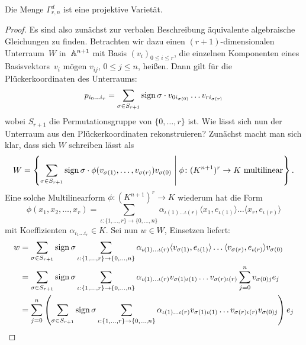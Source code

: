 \begin{fact} \label{fact:gammaproj}
Die Menge $\Gamma_{r,n}^d$ ist eine projektive Varietät.
\end{fact}
\begin{proof}
Es sind also zunächst zur verbalen Beschreibung äquivalente algebraische Gleichungen zu finden. Betrachten wir dazu einen $(r+1)$-dimensionalen Unterraum~$W$ in~$\mathbb A^{n+1}$ mit Basis $(v_i)_{0 \leq i \leq r}$, die einzelnen Komponenten eines Basisvektors~$v_i$ mögen $v_{ij}$, $0 \leq j \leq n$, heißen. Dann gilt für die Plückerkoordinaten des Unterraums:
\begin{equation}
p_{i_0 \dots i_r} = \sum_{\sigma \in S_{r+1}} \operatorname{sign} \sigma \cdot v_{0i_{\sigma(0)}} \dots v_{ri_{\sigma(r)}}
\end{equation}
wobei $S_{r+1}$ die Permutationsgruppe von $\{0,\dots,r\}$ ist. Wie lässt sich nun der Unterraum aus den Plückerkoordinaten rekonstruieren? Zunächst macht man sich klar, dass sich $W$ schreiben lässt als
\begin{equation}
W = \left\{ \sum\limits_{\sigma \in S_{r+1}} \operatorname{sign} \sigma \cdot \phi(v_{\sigma(1)}, \dots, v_{\sigma(r)}) v_{\sigma(0)} \;\middle|\; \phi \colon (K^{n+1})^r \rightarrow K \text{ multilinear} \right\}.
\end{equation}
Eine solche Multilinearform $\phi \colon (K^{n+1})^r \to K$ wiederum hat die Form
\begin{equation}
\phi(x_1, x_2, \dots, x_r) = \sum_{\iota: \{1, \dots, r\} \to \{0, \dots, n\}} \alpha_{\iota(1) \dots \iota(r)} \langle x_1, e_{\iota(1)} \rangle \dots \langle x_r, e_{\iota(r)} \rangle
\end{equation}
mit Koeffizienten $\alpha_{i_1 \dots i_r} \in K$. Sei nun $w \in W$, Einsetzen liefert:
\begin{align*}
w &= \sum\limits_{\sigma \in S_{r+1}} \sign \sigma \sum_{\iota: \{1, \dots, r\} \to \{0, \dots, n\}} \alpha_{\iota(1) \dots \iota(r)} \langle v_{\sigma(1)}, e_{\iota(1)} \rangle \dots \langle v_{\sigma(r)}, e_{\iota(r)} \rangle v_{\sigma(0)} \\
	&= \sum\limits_{\sigma \in S_{r+1}} \sign \sigma \sum_{\iota: \{1, \dots, r\} \to \{0, \dots, n\}} \alpha_{\iota(1) \dots \iota(r)} v_{\sigma(1)\iota(1)} \dots v_{\sigma(r)\iota(r)} \sum_{j=0}^n v_{\sigma(0)j} e_j \\
	&= \sum_{j=0}^n \left(\sum\limits_{\sigma \in S_{r+1}} \sign \sigma \sum_{\iota: \{1, \dots, r\} \to \{0, \dots, n\}} \alpha_{\iota(1) \dots \iota(r)} v_{\sigma(1)\iota(1)} \dots v_{\sigma(r)\iota(r)} v_{\sigma(0)j}\right) e_j \\

\end{align*}
\end{proof}
